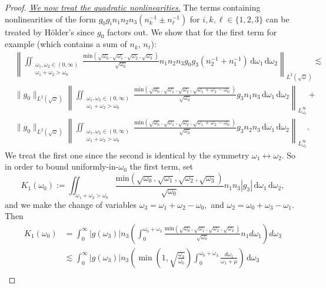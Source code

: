 \documentclass[10pt,a4paper]{amsart}
\newcommand{\dd}{{\, \mathrm d}}
\begin{document}
\begin{proof}
\noindent
\underline{\emph{We now treat the quadratic nonlinearities}.} The terms containing nonlinearities of the form 
$g_0g_i n_1n_2 n_3 (n_k^{-1} \pm n_\ell^{-1})$ for $i, k, \ell \in \{1,2,3\}$ can be treated by H\"{o}lder's since $g_0$ factors out. We show that for the first term for example (which contains a sum of $n_k$, $n_\ell$): 
\begin{align*}
& \left\| 
\iint_{\substack{\omega_1, \omega_2 \in (0,\infty)\\ \omega_1+\omega_2>\omega_0}} 
\frac{\text{min}(\sqrt{\omega_0},\sqrt{\omega_1},\sqrt{\omega_2},\sqrt{\omega_3})}{\sqrt{\omega_0}} 
    n_1n_2n_3 g_0 g_3 ( n_2^{-1} + n_1^{-1} ) \dd\omega_1\dd\omega_2
\right\|_{L^2(\sqrt{\omega})} \lesssim \\
& 
\| g_0 \|_{L^2(\sqrt{\omega})} 
\left\| 
\iint_{\substack{\omega_1, \omega_2 \in (0,\infty)\\ \omega_1+\omega_2>\omega_0}}  \frac{\text{min}(\sqrt{\omega_0},\sqrt{\omega_1},\sqrt{\omega_2},\sqrt{\omega_1+\omega_2-\omega_0})}{\sqrt{\omega_0}} 
 g_3  n_1n_3  \dd\omega_1\dd\omega_2
\right\|_{L_{\omega_0}^\infty} + \\& 
 \| g_0 \|_{L^2(\sqrt{\omega})} 
 \left\| 
 \iint_{\substack{\omega_1, \omega_2 \in (0,\infty)\\ \omega_1+\omega_2>\omega_0}}   \frac{\text{min}(\sqrt{\omega_0},\sqrt{\omega_1},\sqrt{\omega_2},\sqrt{\omega_1+\omega_2-\omega_0})}{\sqrt{\omega_0}}  
   g_3  n_2 n_3  \dd\omega_1\dd\omega_2
\right\|_{L_{\omega_0}^\infty}.
\end{align*}
We treat the first one since the second is identical by the symmetry $\omega_1\leftrightarrow \omega_2$.
So in order to bound uniformly-in-$\omega_0$ the first term, set
$$
K_1(\omega_0)
:= \iint_{\omega_1+\omega_2>\omega_0}
\frac{\text{min}(\sqrt{\omega_0},\sqrt{\omega_1},\sqrt{\omega_2},\sqrt{\omega_3})}{\sqrt{\omega_0}} n_1n_3 |g_3| \dd\omega_1 \dd \omega_2,
$$ and we make the change of variables
$\omega_3=\omega_1+\omega_2-\omega_0,$ and $\omega_2=\omega_0+\omega_3-\omega_1.$ Then 
\begin{align*} 
K_1(\omega_0) 
&= \int_0^\infty |g(\omega_3)|n_3
\left(
\int_0^{\omega_0+\omega_3}
\frac{\text{min}(\sqrt{\omega_0},\sqrt{\omega_1},\sqrt{\omega_2},\sqrt{\omega_3})}{\sqrt{\omega_0}} n_1 d\omega_1
\right) d\omega_3
\\
& \lesssim 
\int_0^\infty |g(\omega_3)|n_3 \left( \min\left(1,\sqrt{\frac{\omega_3}{\omega_0}}\right)
\int_0^{\omega_0+\omega_3}\frac{d\omega_1}{\omega_1+\mu} \right) \dd\omega_3
\\ & 

\end{align*}
\end{proof}
\end{document}
